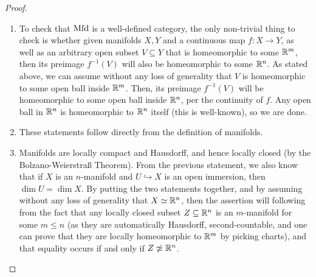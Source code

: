             \begin{proof}
                \begin{enumerate}
                    \item To check that $\mathrm{Mfd}$ is a well-defined category, the only non-trivial thing to check is whether given manifolds $X, Y$ and a continuous map $f: X \to Y$, as well as an arbitrary open subset $V \subseteq Y$ that is homeomorphic to some $\mathbb{R}^m$, then its preimage $f^{-1}(V)$ will also be homeomorphic to some $\mathbb{R}^n$. As stated above, we can assume without any loss of generality that $V$ is homeomorphic to some open ball inside $\mathbb{R}^m$. Then, its preimage $f^{-1}(V)$ will be homeomorphic to some open ball inside $\mathbb{R}^n$, per the continuity of $f$. Any open ball in $\mathbb{R}^n$ is homeomorphic to $\mathbb{R}^n$ itself (this is well-known), so we are done.
                    \item These statements follow directly from the definition of manifolds.
                    \item Manifolds are locally compact and Hausdorff, and hence locally closed (by the Bolzano-Weierstra{\ss} Theorem). From the previous statement, we also know that if $X$ is an $n$-manifold and $U \hookrightarrow  X$ is an open immersion, then $\dim U = \dim X$. By putting the two statements together, and by assuming without any loss of generality that $X \simeq \mathbb{R}^n$, then the assertion will following from the fact that any locally closed subset $Z \subseteq \mathbb{R}^n$ is an $m$-manifold for some $m \leq n$ (as they are automatically Hausdorff, second-countable, and one can prove that they are locally homeomorphic to $\mathbb{R}^m$ by picking charts), and that equality occurs if and only if $Z \not \simeq \mathbb{R}^n$.
                \end{enumerate}
            \end{proof}

